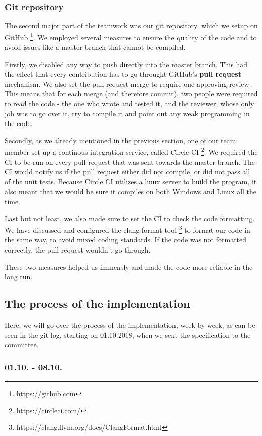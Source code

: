 \subsubsection{Git repository}
The second major part of the teamwork was our git repository, which we setup on GitHub \footnote{https://github.com}. We employed several measures to ensure the quality of the code and to avoid issues like a master branch that cannot be compiled.

Firstly, we disabled any way to push directly into the master branch. This had the effect that every contribution has to go throught GitHub's \textbf{pull request} mechanism. We also set the pull request merge to require one approving review. This means that for each merge (and therefore commit), two people were required to read the code - the one who wrote and tested it, and the reviewer, whose only job was to go over it, try to compile it and point out any weak programming in the code.

Secondly, as we already mentioned in the previous section, one of our team member set up a continous integration service, called Circle CI \footnote{https://circleci.com/}. We required the CI to be run on every pull request that was sent towards the master branch. The CI would notify us if the pull request either did not compile, or did not pass all of the unit tests. Because Circle CI utilizes a linux server to build the program, it also meant that we would be sure it compiles on both Windows and Linux all the time.

Last but not least, we also made sure to set the CI to check the code formatting. We have discussed and configured the clang-format tool \footnote{https://clang.llvm.org/docs/ClangFormat.html} to format our code in the same way, to avoid mixed coding standards. If the code was not formatted correctly, the pull request wouldn't go through.

These two measures helped us immensly and made the code more reliable in the long run.

\subsection{The process of the implementation}

Here, we will go over the process of the implementation, week by week, as can be seen in the git log, starting on 01.10.2018, when we sent the specification to the committee.

\subsubsection{01.10. - 08.10.}

